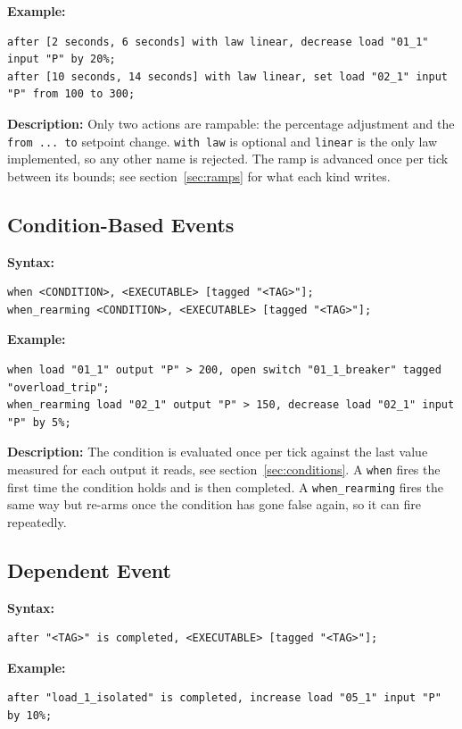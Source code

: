 \documentclass[12pt]{article}
\begin{document}
\textbf{Example:}
\begin{lstlisting}
after [2 seconds, 6 seconds] with law linear, decrease load "01_1" input "P" by 20%;
after [10 seconds, 14 seconds] with law linear, set load "02_1" input "P" from 100 to 300;
\end{lstlisting}

\textbf{Description:} Only two actions are rampable: the percentage adjustment and the \texttt{from ... to} setpoint change. \texttt{with law} is optional and \texttt{linear} is the only law implemented, so any other name is rejected. The ramp is advanced once per tick between its bounds; see section~\ref{sec:ramps} for what each kind writes.

\subsection{Condition-Based Events}

\textbf{Syntax:}
\begin{lstlisting}
when <CONDITION>, <EXECUTABLE> [tagged "<TAG>"];
when_rearming <CONDITION>, <EXECUTABLE> [tagged "<TAG>"];
\end{lstlisting}

\textbf{Example:}
\begin{lstlisting}
when load "01_1" output "P" > 200, open switch "01_1_breaker" tagged "overload_trip";
when_rearming load "02_1" output "P" > 150, decrease load "02_1" input "P" by 5%;
\end{lstlisting}

\textbf{Description:} The condition is evaluated once per tick against the last value measured for each output it reads, see section~\ref{sec:conditions}. A \texttt{when} fires the first time the condition holds and is then completed. A \texttt{when\_rearming} fires the same way but re-arms once the condition has gone false again, so it can fire
repeatedly.

\subsection{Dependent Event}

\textbf{Syntax:}
\begin{lstlisting}
after "<TAG>" is completed, <EXECUTABLE> [tagged "<TAG>"];
\end{lstlisting}

\textbf{Example:}
\begin{lstlisting}
after "load_1_isolated" is completed, increase load "05_1" input "P" by 10%;
\end{lstlisting}
\end{document}
